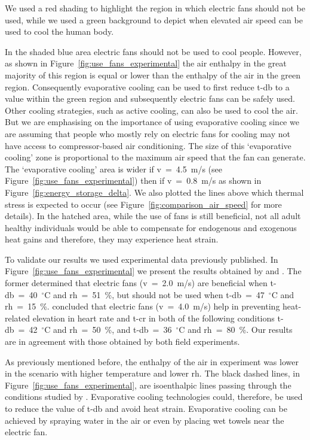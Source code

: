 We used a red shading to highlight the region in which electric fans should not be used, while we used a green background to depict when elevated air speed can be used to cool the human body.

In the shaded blue area electric fans should not be used to cool people.
However, as shown in Figure~\ref{fig:use_fans_experimental} the air enthalpy in the great majority of this region is equal or lower than the enthalpy of the air in the green region.
Consequently evaporative cooling can be used to first reduce \ac{t-db} to a value within the green region and subsequently electric fans can be safely used.
Other cooling strategies, such as active cooling, can also be used to cool the air.
But we are emphasising on the importance of using evaporative cooling since we are assuming that people who mostly rely on electric fans for cooling may not have access to compressor-based air conditioning.
The size of this `evaporative cooling' zone is proportional to the maximum air speed that the fan can generate.
The `evaporative cooling' area is wider if \ac{v}~=~4.5~m/s (see Figure~\ref{fig:use_fans_experimental}) then if \ac{v}~=~0.8~m/s as shown in Figure~\ref{fig:energy_storage_delta}.
We also plotted the lines above which thermal stress is expected to occur (see Figure~\ref{fig:comparison_air_speed} for more details).
In the hatched area, while the use of fans is still beneficial, not all adult healthy individuals would be able to compensate for endogenous and exogenous heat gains and therefore, they may experience heat strain.

To validate our results we used experimental data previously published.
In Figure~\ref{fig:use_fans_experimental} we present the results obtained by  and .
The former determined that electric fans (\ac{v}~=~2.0~m/s) are beneficial when \ac{t-db}~=~40~$^{\circ}$C and \ac{rh}~=~51~\%, but should not be used when \ac{t-db}~=~47~$^{\circ}$C and \ac{rh}~=~15~\%.
 concluded that electric fans (\ac{v}~=~4.0~m/s) help in preventing heat-related elevation in heart rate and \ac{t-cr} in both of the following conditions \ac{t-db}~=~42~$^{\circ}$C and \ac{rh}~=~50~\%, and \ac{t-db}~=~36~$^{\circ}$C and \ac{rh}~=~80~\%.
Our results are in agreement with those obtained by both field experiments.

As previously mentioned before, the enthalpy of the air in  experiment was lower in the scenario with higher temperature and lower \ac{rh}.
The black dashed lines, in Figure~\ref{fig:use_fans_experimental}, are isoenthalpic lines passing through the conditions studied by .
Evaporative cooling technologies could, therefore, be used to reduce the value of \ac{t-db} and avoid heat strain.
Evaporative cooling can be achieved by spraying water in the air or even by placing wet towels near the electric fan.

